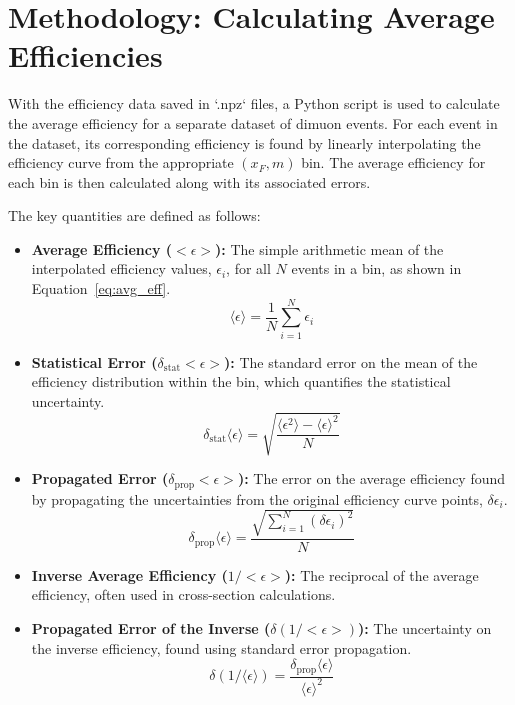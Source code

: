 \documentclass[11pt]{article}
\begin{document}


\section{Methodology: Calculating Average Efficiencies}
With the efficiency data saved in `.npz` files, a Python script is used to calculate the average efficiency for a separate dataset of dimuon events. For each event in the dataset, its corresponding efficiency is found by linearly interpolating the efficiency curve from the appropriate $(x_F, m)$ bin. The average efficiency for each bin is then calculated along with its associated errors.

The key quantities are defined as follows:
\begin{itemize}
    \item \textbf{Average Efficiency ($<\epsilon>$):} The simple arithmetic mean of the interpolated efficiency values, $\epsilon_i$, for all $N$ events in a bin, as shown in Equation~\ref{eq:avg_eff}.
    \begin{equation} \label{eq:avg_eff}
        \langle\epsilon\rangle = \frac{1}{N} \sum_{i=1}^{N} \epsilon_i
    \end{equation}

    \item \textbf{Statistical Error ($\delta_{\text{stat}} <\epsilon>$):} The standard error on the mean of the efficiency distribution within the bin, which quantifies the statistical uncertainty.
    \begin{equation} \label{eq:stat_err}
        \delta_{\text{stat}} \langle\epsilon\rangle = \sqrt{\frac{\langle\epsilon^2\rangle - \langle\epsilon\rangle^2}{N}}
    \end{equation}

    \item \textbf{Propagated Error ($\delta_{\text{prop}} <\epsilon>$):} The error on the average efficiency found by propagating the uncertainties from the original efficiency curve points, $\delta\epsilon_i$.
    \begin{equation} \label{eq:prop_err}
        \delta_{\text{prop}} \langle\epsilon\rangle = \frac{\sqrt{\sum_{i=1}^{N} (\delta\epsilon_i)^2}}{N}
    \end{equation}

    \item \textbf{Inverse Average Efficiency ($1/<\epsilon>$):} The reciprocal of the average efficiency, often used in cross-section calculations.

    \item \textbf{Propagated Error of the Inverse ($\delta(1/<\epsilon>)$):} The uncertainty on the inverse efficiency, found using standard error propagation.
    \begin{equation} \label{eq:inv_err}
        \delta(1/\langle\epsilon\rangle) = \frac{\delta_{\text{prop}}\langle\epsilon\rangle}{\langle\epsilon\rangle^2}
    \end{equation}
\end{itemize}
\end{document}
